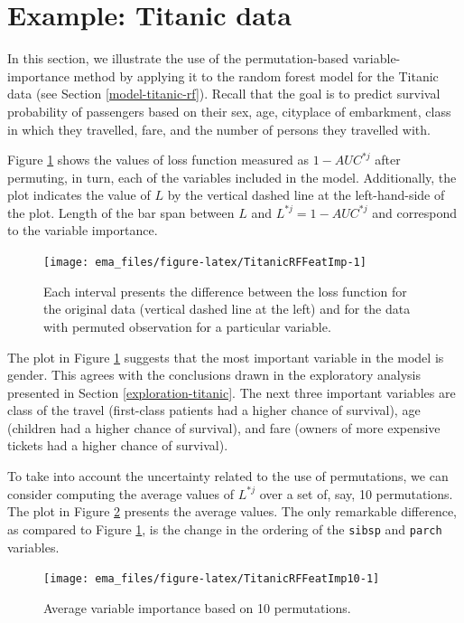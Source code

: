 \documentclass[]{krantz}
\begin{document}
\hypertarget{featureImportanceTitanic}{%
\section{Example: Titanic data}\label{featureImportanceTitanic}}

In this section, we illustrate the use of the permutation-based variable-importance method by applying it to the random forest model for the Titanic data (see Section \ref{model-titanic-rf}). Recall that the goal is to predict survival probability of passengers based on their sex, age, cityplace of embarkment, class in which they travelled, fare, and the number of persons they travelled with.

Figure \ref{fig:TitanicRFFeatImp} shows the values of loss function measured as \(1-AUC^{*j}\) after permuting, in turn, each of the variables included in the model. Additionally, the plot indicates the value of \(L\) by the vertical dashed line at the left-hand-side of the plot. Length of the bar span between \(L\) and \(L^{*j}=1-AUC^{*j}\) and correspond to the variable importance.

\begin{figure}
\texttt{[image: ema\_files/figure-latex/TitanicRFFeatImp-1]} \caption{Each interval presents the difference between the loss function for the original data (vertical dashed line at the left) and for the data with permuted observation for a particular variable.}\label{fig:TitanicRFFeatImp}
\end{figure}

The plot in Figure \ref{fig:TitanicRFFeatImp} suggests that the most important variable in the model is gender. This agrees with the conclusions drawn in the exploratory analysis presented in Section \ref{exploration-titanic}. The next three important variables are class of the travel (first-class patients had a higher chance of survival), age (children had a higher chance of survival), and fare (owners of more expensive tickets had a higher chance of survival).

To take into account the uncertainty related to the use of permutations, we can consider computing the average values of \(L^{*j}\) over a set of, say, 10 permutations. The plot in Figure \ref{fig:TitanicRFFeatImp10} presents the average values. The only remarkable difference, as compared to Figure \ref{fig:TitanicRFFeatImp}, is the change in the ordering of the \texttt{sibsp} and \texttt{parch} variables.

\begin{figure}
\texttt{[image: ema\_files/figure-latex/TitanicRFFeatImp10-1]} \caption{Average variable importance based on 10 permutations.}\label{fig:TitanicRFFeatImp10}
\end{figure}
\end{document}
